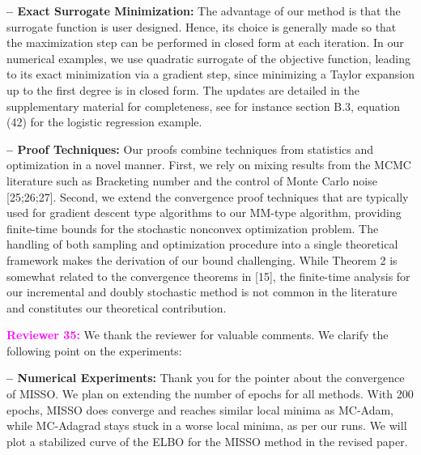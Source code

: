 \documentclass{article}
\begin{document}
\vspace{0.03in}
\textbf{-- Exact Surrogate Minimization:} 
The advantage of our method is that the surrogate function is user designed.
Hence, its choice is generally made so that the maximization step can be performed in closed form at each iteration.
In our numerical examples, we use quadratic surrogate of the objective function, leading to its exact minimization via a gradient step, since minimizing a Taylor expansion up to the first degree is in closed form.
The updates are detailed in the supplementary material for completeness, see for instance section B.3, equation (42) for the logistic regression example.

\vspace{0.03in}
\textbf{-- Proof Techniques:} 
Our proofs combine techniques from statistics and optimization in a novel manner. First, we rely on mixing results from the MCMC literature such as Bracketing number and the control of Monte Carlo noise [25;26;27]. Second, we extend the convergence proof techniques that are typically used for gradient descent type algorithms to our MM-type algorithm, providing finite-time bounds for the stochastic nonconvex optimization problem. The handling of both sampling and optimization procedure into a single theoretical framework makes the derivation of our bound challenging. While Theorem 2 is somewhat related to the convergence theorems in [15], the finite-time analysis for our incremental and doubly stochastic method is not common in the literature and constitutes our theoretical contribution.

\medskip
\textbf{\textcolor{magenta}{Reviewer 35:}} We thank the reviewer for valuable comments. We clarify the following point on the experiments: 

\vspace{0.03in}
\textbf{-- Numerical Experiments:} 
Thank you for the pointer about the convergence of MISSO.
We plan on extending the number of epochs for all methods.
With 200 epochs, MISSO does converge and reaches similar local minima as MC-Adam, while MC-Adagrad stays stuck in a worse local minima, as per our runs.
We will plot a stabilized curve of the ELBO for the MISSO method in the revised paper.
\end{document}
